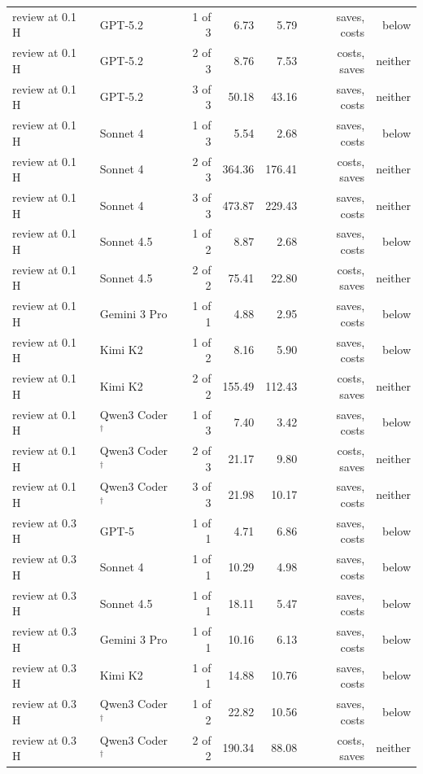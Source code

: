 \begin{table}[t]
\begin{tabular}{llrrrrr}
review at 0.1 H & GPT-5.2 & 1 of 3 & 6.73 & 5.79 & saves, costs & below \\
review at 0.1 H & GPT-5.2 & 2 of 3 & 8.76 & 7.53 & costs, saves & neither \\
review at 0.1 H & GPT-5.2 & 3 of 3 & 50.18 & 43.16 & saves, costs & neither \\
review at 0.1 H & Sonnet 4 & 1 of 3 & 5.54 & 2.68 & saves, costs & below \\
review at 0.1 H & Sonnet 4 & 2 of 3 & 364.36 & 176.41 & costs, saves & neither \\
review at 0.1 H & Sonnet 4 & 3 of 3 & 473.87 & 229.43 & saves, costs & neither \\
review at 0.1 H & Sonnet 4.5 & 1 of 2 & 8.87 & 2.68 & saves, costs & below \\
review at 0.1 H & Sonnet 4.5 & 2 of 2 & 75.41 & 22.80 & costs, saves & neither \\
review at 0.1 H & Gemini 3 Pro & 1 of 1 & 4.88 & 2.95 & saves, costs & below \\
review at 0.1 H & Kimi K2 & 1 of 2 & 8.16 & 5.90 & saves, costs & below \\
review at 0.1 H & Kimi K2 & 2 of 2 & 155.49 & 112.43 & costs, saves & neither \\
review at 0.1 H & Qwen3 Coder$^\dagger$ & 1 of 3 & 7.40 & 3.42 & saves, costs & below \\
review at 0.1 H & Qwen3 Coder$^\dagger$ & 2 of 3 & 21.17 & 9.80 & costs, saves & neither \\
review at 0.1 H & Qwen3 Coder$^\dagger$ & 3 of 3 & 21.98 & 10.17 & saves, costs & neither \\
\midrule
review at 0.3 H & GPT-5 & 1 of 1 & 4.71 & 6.86 & saves, costs & below \\
review at 0.3 H & Sonnet 4 & 1 of 1 & 10.29 & 4.98 & saves, costs & below \\
review at 0.3 H & Sonnet 4.5 & 1 of 1 & 18.11 & 5.47 & saves, costs & below \\
review at 0.3 H & Gemini 3 Pro & 1 of 1 & 10.16 & 6.13 & saves, costs & below \\
review at 0.3 H & Kimi K2 & 1 of 1 & 14.88 & 10.76 & saves, costs & below \\
review at 0.3 H & Qwen3 Coder$^\dagger$ & 1 of 2 & 22.82 & 10.56 & saves, costs & below \\
review at 0.3 H & Qwen3 Coder$^\dagger$ & 2 of 2 & 190.34 & 88.08 & costs, saves & neither \\
\bottomrule
\end{tabular}
\end{table}
